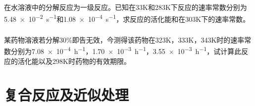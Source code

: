 \documentclass[dvipsnames, svgnames, x11names]{beamer}
\begin{document}



\begin{frame}[t]
    \frametitle{}

    \begin{example}
        在水溶液中的分解反应为一级反应。已知在33K和283K下反应的速率常数分别为\SI{5.48e-2}{s^{-1}}和\SI{1.08e-4}{s^{-1}}，求反应的活化能和在303K下的速率常数。
    \end{example}

\end{frame}





\begin{frame}[t]
    \frametitle{}
    \begin{example}
        某药物溶液若分解30\%即告无效，今测得该药物在323K，333K，343K时的速率常数分别为\SI{7.08e-4}{h^{-1}}，\SI{1.70e-3}{h^{-1}}，\SI{3.55e-3}{h^{-1}}，试计算此反应的活化能以及298K时药物的有效期限。
    \end{example}
\end{frame}


\section{复合反应及近似处理}
\end{document}
